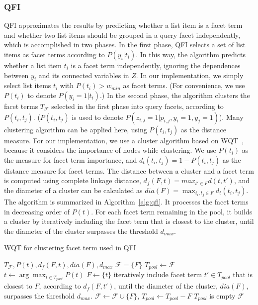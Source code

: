\subsubsection{QFI}
QFI approximates the results by predicting whether a list item is a facet term and whether two list items should be grouped in a query facet independently, which is accomplished in two phases.
In the first phase, QFI selects a set of list items as facet terms according to $P(y_i|t_i)$.
In this way, the algorithm predicts whether a list item $t_i$ is a facet term independently, ignoring the dependences between $y_i$ and its connected variables in $Z$.
In our implementation, we simply select list items $t_i$ with  $P(t_i)> w_{min}$ as facet terms. (For convenience, we use $P(t_i)$ to denote $P(y_i=1|t_i)$.)
In the second phase, the algorithm clusters the facet terms $T_\mathcal{F}$ selected in the first phase into query facets, according to $P(t_i,t_j)$. ($P(t_i, t_j)$ is used to denote $P(z_{i,j}=1|p_{i,j},y_i=1,y_j=1)$).
Many clustering algorithm can be applied here, using $P(t_i,t_j)$ as the distance measure.
For our implementation, we use a cluster algorithm based on WQT~\cite{dou2011finding}, because it considers the importance of nodes while clustering.
We use $P(t_i)$ as the measure for facet term importance, and $d_t(t_i,t_j)=1-P(t_i, t_j)$ as the distance measure for facet terms. The distance between a cluster and a facet term is computed using complete linkage distance, $d_f(F,t)=max_{t' \in F}{d(t, t')}$, and the diameter of a cluster can be calculated as $dia(F)=\max_{t_i,t_j\in F}{d_t(t_i,t_j)}$. The algorithm is summarized in Algorithm~\ref{alg:qfi}. It processes the facet terms in decreasing order of $P(t)$. For each facet term remaining in the pool, it builds a cluster by iteratively including the facet term that is closest to the cluster, until the diameter of the cluster surpasses the threshold $d_{max}$. 
\begin{algorithm}[ht!]
 \caption{WQT for clustering facet term used in QFI}
\label{alg:qfi}
\begin{algorithmic}[1]
  \Require $T_{\mathcal{F}}, P(t), d_f(F,t), dia(F), d_{max}$
  \Ensure $\mathcal{F}=\{F\}$
  \State $T_{pool} \leftarrow \mathcal{F}$
  \Repeat
    \State $t \leftarrow \arg\max_{t\in T_{pool}}{P(t)}$
    \State $F \leftarrow \{t\}$
    \State iteratively include facet term $t' \in T_{pool}$ that is closest to $F$, according to $d_f(F,t')$, until the diameter of the cluster, $dia(F)$, surpasses the threshold $d_{max}$.
    \State $\mathcal{F} \leftarrow \mathcal{F} \cup \{F\}$, $T_{pool} \leftarrow T_{pool} - F$
  \Until $T_{pool}$ is empty
  \State \Return $\mathcal{F}$
\end{algorithmic}
\end{algorithm}


